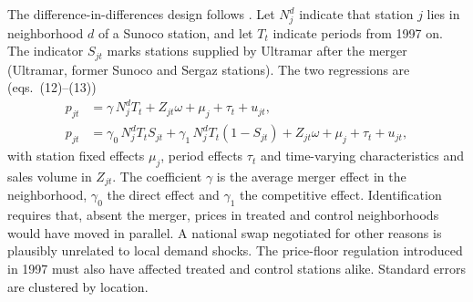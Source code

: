 The difference-in-differences design follows \citet{Hastings2004}. Let $N^d_j$ indicate that station $j$ lies in
neighborhood $d$ of a Sunoco station, and let $T_t$ indicate periods from 1997 on. The indicator $S_{jt}$ marks stations
supplied by Ultramar after the merger (Ultramar, former Sunoco and Sergaz stations). The two regressions are (eqs.~(12)--(13))
\begin{align}
p_{jt} &= \gamma\, N^d_j T_t + Z_{jt}\omega + \mu_j + \tau_t + u_{jt}, \label{eq:11-houde-did}\\
p_{jt} &= \gamma_0\, N^d_j T_t S_{jt} + \gamma_1\, N^d_j T_t (1 - S_{jt}) + Z_{jt}\omega + \mu_j + \tau_t + u_{jt},
\label{eq:11-houde-did2}
\end{align}
with station fixed effects $\mu_j$, period effects $\tau_t$ and time-varying characteristics and sales volume in
$Z_{jt}$. The coefficient $\gamma$ is the average merger effect in the neighborhood, $\gamma_0$ the direct effect and
$\gamma_1$ the competitive effect. Identification requires that, absent the merger, prices in treated and control
neighborhoods would have moved in parallel. A national swap negotiated for other reasons is plausibly unrelated to
local demand shocks. The price-floor regulation introduced in 1997 must also have affected treated and control
stations alike. Standard errors are clustered by location.

